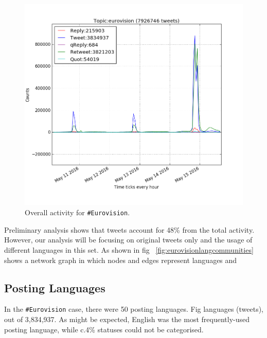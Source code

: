 \documentclass{llncs}
\begin{document}
\begin{figure}[htb]
\centering
\includegraphics[width=0.8\columnwidth]{images/overalleurovisionactivity.png}
\caption{Overall activity for {\texttt{\#Eurovision}}.}
\label{fig:overalleurovisionactivity}
\end{figure}

Preliminary analysis shows that tweets account
for 48\% from the total activity. However, our analysis will be focusing on
original tweets only and the usage of different languages in this set. As shown in 
fig ~\ref{fig:eurovisionlangcommunities} shows a network graph in which nodes and edges 
represent languages and 

\subsection{Posting Languages}\label{eurovisionpostinglangs}

In the {\texttt{\#Eurovision}} case, there were 50 posting
languages. Fig
languages (tweets), out of 3,834,937. As might be expected, English
was the most frequently-used posting language, while c.4\% statuses
could not be categorised.
\end{document}
